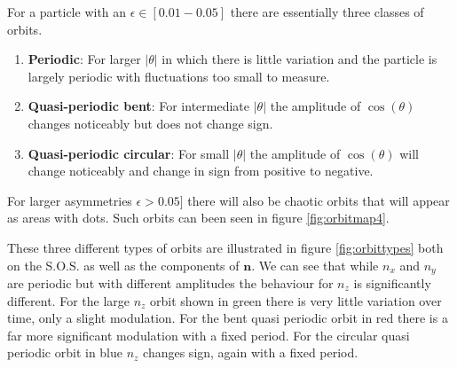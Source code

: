 For a particle with an $\epsilon \in \left[0.01-0.05\right]$ there are essentially three classes of orbits.

\begin{enumerate}
\item \textbf{Periodic}: For larger $\left|\theta\right|$ in which there is little variation and the particle is largely periodic with fluctuations too small to measure.
\item \textbf{Quasi-periodic bent}: For intermediate $\left|\theta\right|$ the amplitude of $\cos(\theta)$ changes noticeably but does not change sign.
\item \textbf{Quasi-periodic circular}: For small $\left|\theta\right|$ the amplitude of $\cos(\theta)$ will change noticeably and change in sign from positive to negative.
\end{enumerate}

For larger asymmetries $\epsilon > 0.05]$ there will also be chaotic orbits that will appear as areas with dots. Such orbits can been seen in figure \ref{fig:orbitmap4}.

These three different types of orbits are illustrated in figure \ref{fig:orbittypes} both on the S.O.S. as well as the 
components of $\mathbf{n}$. We can see that while $n_x$ and $n_y$ are periodic but with different amplitudes the 
behaviour for $n_z$ is significantly different. For the large $n_z$ orbit shown in green there is very little variation 
over time, only a slight modulation. For the bent quasi periodic orbit in red there is a far more significant 
modulation with a fixed period. For the circular quasi periodic orbit in blue $n_z$ changes sign, again with a fixed 
period.




